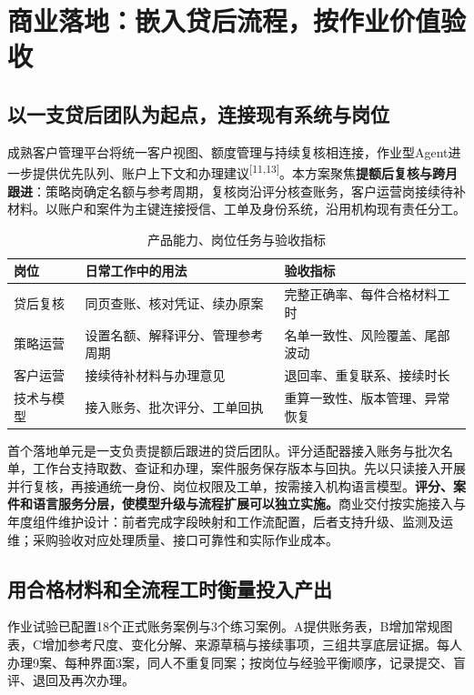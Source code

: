 
\clearpage
\section{商业落地：嵌入贷后流程，按作业价值验收}
\subsection{以一支贷后团队为起点，连接现有系统与岗位}
成熟客户管理平台将统一客户视图、额度管理与持续复核相连接，作业型Agent进一步提供优先队列、账户上下文和办理建议\textsuperscript{[11,13]}。本方案聚焦\textbf{提额后复核与跨月跟进}：策略岗确定名额与参考周期，复核岗沿评分核查账务，客户运营岗接续待补材料。以账户和案件为主键连接授信、工单及身份系统，沿用机构现有责任分工。

\begin{table}[H]\centering\caption{产品能力、岗位任务与验收指标}\small
\begin{tabularx}{\linewidth}{@{}p{20mm}YY@{}}\toprule
岗位 & 日常工作中的用法 & 验收指标\\\midrule
贷后复核 & 同页查账、核对凭证、续办原案 & 完整正确率、每件合格材料工时\\
策略运营 & 设置名额、解释评分、管理参考周期 & 名单一致性、风险覆盖、尾部波动\\
客户运营 & 接续待补材料与办理意见 & 退回率、重复联系、接续时长\\
技术与模型 & 接入账务、批次评分、工单回执 & 重算一致性、版本管理、异常恢复\\\bottomrule
\end{tabularx}\end{table}

首个落地单元是一支负责提额后跟进的贷后团队。评分适配器接入账务与批次名单，工作台支持取数、查证和办理，案件服务保存版本与回执。先以只读接入开展并行复核，再接通统一身份、岗位权限及工单，按需接入机构语言模型。\textbf{评分、案件和语言服务分层，使模型升级与流程扩展可以独立实施。}商业交付按实施接入与年度组件维护设计：前者完成字段映射和工作流配置，后者支持升级、监测及运维；采购验收对应处理质量、接口可靠性和实际作业成本。

\subsection{用合格材料和全流程工时衡量投入产出}
作业试验已配置18个正式账务案例与3个练习案例。A提供账务表，B增加常规图表，C增加参考尺度、变化分解、来源草稿与接续事项，三组共享底层证据。每人办理9案、每种界面3案，同人不重复同案；按岗位与经验平衡顺序，记录提交、盲评、退回及再次办理。

